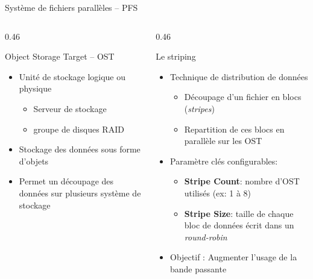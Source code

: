 \documentclass[svgnames,9pt,aspectratio=169]{beamer}
\begin{document}
\begin{frame}{Système de fichiers parallèles -- PFS}
  \begin{columns}[t]
    
    \begin{column}{0.46\textwidth}
      \begin{block}{Object Storage Target -- OST}
        \begin{itemize}
          \item Unité de stockage logique ou physique
          \begin{itemize}
            \item Serveur de stockage
            \item groupe de disques RAID
          \end{itemize}
          \item Stockage des données sous forme d'objets
          \item Permet un découpage des données sur plusieurs système de stockage 
        \end{itemize}
      \end{block}
    \end{column}

    \begin{column}{0.46\textwidth}
      \begin{block}{Le striping}
        \begin{itemize}
          \item Technique de distribution de données
          \begin{itemize}
            \item Découpage d'un fichier en blocs (\textit{stripes})
            \item Repartition de ces blocs en parallèle sur les OST
          \end{itemize}
          \item Paramètre clés configurables:
          \begin{itemize}
            \item \textbf{Stripe Count}: nombre d'OST utilisés (ex: 1 à 8)
            \item \textbf{Stripe Size}: taille de chaque bloc de données écrit dans un \textit{round-robin}
          \end{itemize}
          \item Objectif : Augmenter l'usage de la bande passante
        \end{itemize}
      \end{block}
    \end{column}
  \end{columns}
\end{frame}
\end{document}
